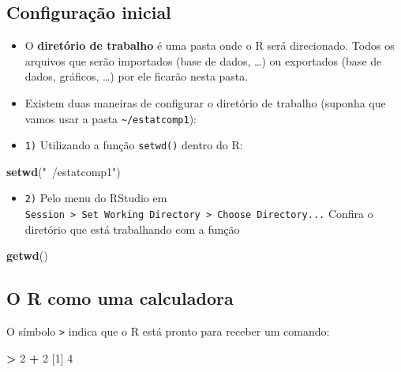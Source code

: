 \documentclass[10pt,a4paper]{book}
\newenvironment{Shaded}{\begin{snugshade}}{\end{snugshade}}
\newcommand{\KeywordTok}[1]{\textcolor[rgb]{0.13,0.29,0.53}{\textbf{#1}}}
\newcommand{\DecValTok}[1]{\textcolor[rgb]{0.00,0.00,0.81}{#1}}
\newcommand{\StringTok}[1]{\textcolor[rgb]{0.31,0.60,0.02}{#1}}
\newcommand{\OperatorTok}[1]{\textcolor[rgb]{0.81,0.36,0.00}{\textbf{#1}}}
\newcommand{\NormalTok}[1]{#1}
\providecommand{\tightlist}{%
  \setlength{\itemsep}{0pt}\setlength{\parskip}{0pt}}
\begin{document}
\subsection{Configuração inicial}\label{configuracao-inicial}

\begin{itemize}
\item
  O \textbf{diretório de trabalho} é uma pasta onde o R será
  direcionado. Todos os arquivos que serão importados (base de dados,
  \ldots{}) ou exportados (base de dados, gráficos, \ldots{}) por ele
  ficarão nesta pasta.
\item
  Existem duas maneiras de configurar o diretório de trabalho (suponha
  que vamos usar a pasta \texttt{\textasciitilde{}/estatcomp1}):
\item
  \texttt{1)} Utilizando a função \texttt{setwd()} dentro do R:
\end{itemize}

\begin{Shaded}
\begin{Highlighting}[]
\KeywordTok{setwd}\NormalTok{(}\StringTok{"~/estatcomp1"}\NormalTok{)}
\end{Highlighting}
\end{Shaded}

\begin{itemize}
\tightlist
\item
  \texttt{2)} Pelo menu do RStudio em
  \texttt{Session\ \textgreater{}\ Set\ Working\ Directory\ \textgreater{}\ Choose\ Directory...}
  Confira o diretório que está trabalhando com a função
\end{itemize}

\begin{Shaded}
\begin{Highlighting}[]
\KeywordTok{getwd}\NormalTok{()}
\end{Highlighting}
\end{Shaded}

\subsection{O R como uma calculadora}\label{o-r-como-uma-calculadora}

O símbolo \texttt{\textgreater{}} indica que o R está pronto para
receber um comando:

\begin{Shaded}
\begin{Highlighting}[]
\OperatorTok{>}\StringTok{ }\DecValTok{2} \OperatorTok{+}\StringTok{ }\DecValTok{2}
\NormalTok{[}\DecValTok{1}\NormalTok{] }\DecValTok{4}
\end{Highlighting}
\end{Shaded}
\end{document}
